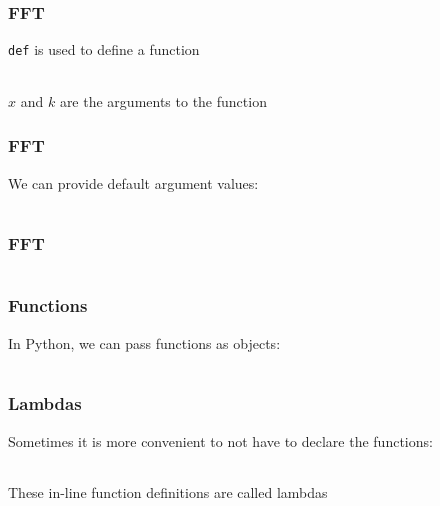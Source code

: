 \documentclass{beamer}
\begin{document}
\begin{frame}
\frametitle{FFT}
\texttt{def} is used to define a function

\begin{center}
\begin{tabular}{c}

\end{tabular}
\end{center}

$x$ and $k$ are the arguments to the function
\end{frame}

\begin{frame}
\frametitle{FFT}

We can provide default argument values:

\begin{center}
\begin{tabular}{c}

\end{tabular}
\end{center}

\end{frame}


\begin{frame}
\frametitle{FFT}

\begin{center}
\begin{tabular}{c}

\end{tabular}
\end{center}

\end{frame}

\begin{frame}
\frametitle{Functions}
In Python, we can pass functions as objects:

\begin{center}
\begin{tabular}{c}

\end{tabular}
\end{center}

\end{frame}

\begin{frame}
\frametitle{Lambdas}
Sometimes it is more convenient to not have to declare the functions:

\begin{center}
\begin{tabular}{c}

\end{tabular}
\end{center}

These in-line function definitions are called lambdas

\end{frame}
\end{document}
